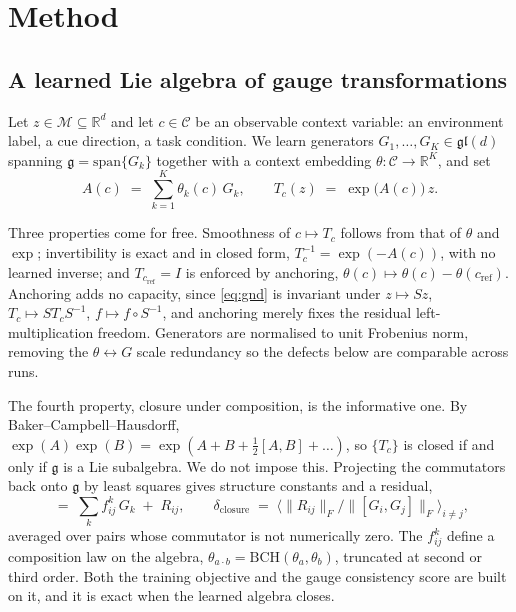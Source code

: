 \documentclass{article}
\theoremstyle{plain}
\newcommand{\gl}{\mathfrak{gl}}
\newcommand{\R}{\mathbb{R}}
\newcommand{\Mfd}{\mathcal{M}}
\newcommand{\Ctx}{\mathcal{C}}
\newcommand{\bch}{\mathrm{BCH}}
\begin{document}
\section{Method}
\label{sec:method}

\subsection{A learned Lie algebra of gauge transformations}

Let $z \in \Mfd \subseteq \R^{d}$ and let $c \in \Ctx$ be an observable context
variable: an environment label, a cue direction, a task condition. We learn
generators $G_1,\dots,G_K \in \gl(d)$ spanning $\mathfrak{g} =
\mathrm{span}\{G_k\}$ together with a context embedding $\theta : \Ctx \to
\R^{K}$, and set
\begin{equation}
  A(c) \;=\; \sum_{k=1}^{K}\theta_k(c)\,G_k,
  \qquad
  T_c(z) \;=\; \exp\!\big(A(c)\big)\, z .
  \label{eq:gauge}
\end{equation}

Three properties come for free. Smoothness of $c \mapsto T_c$ follows from that
of $\theta$ and $\exp$; invertibility is exact and in closed form,
$T_c^{-1} = \exp(-A(c))$, with no learned inverse; and $T_{c_{\mathrm{ref}}} = I$
is enforced by anchoring, $\theta(c) \mapsto \theta(c) -
\theta(c_{\mathrm{ref}})$. Anchoring adds no capacity, since \eqref{eq:gnd} is
invariant under $z \mapsto Sz$, $T_c \mapsto S T_c S^{-1}$, $f \mapsto f\circ
S^{-1}$, and anchoring merely fixes the residual left-multiplication freedom.
Generators are normalised to unit Frobenius norm, removing the $\theta
\leftrightarrow G$ scale redundancy so the defects below are comparable across
runs.

The fourth property, closure under composition, is the informative one. By
Baker--Campbell--Hausdorff, $\exp(A)\exp(B) = \exp(A + B + \tfrac12[A,B] +
\dots)$, so $\{T_c\}$ is closed if and only if $\mathfrak{g}$ is a Lie
subalgebra. We do not impose this. Projecting the commutators back onto
$\mathfrak{g}$ by least squares gives structure constants and a residual,
\begin{equation}
  [G_i, G_j] \;=\; \sum_{k} f^{k}_{ij}\, G_k \;+\; R_{ij},
  \qquad
  \delta_{\mathrm{closure}} \;=\;
  \big\langle \|R_{ij}\|_F / \|[G_i,G_j]\|_F \big\rangle_{i \neq j},
  \label{eq:closure}
\end{equation}
averaged over pairs whose commutator is not numerically zero. The $f^{k}_{ij}$
define a composition law on the algebra, $\theta_{a\cdot b} =
\bch(\theta_a,\theta_b)$, truncated at second or third order. Both the training
objective and the gauge consistency score are built on it, and it is exact when
the learned algebra closes.
\end{document}

